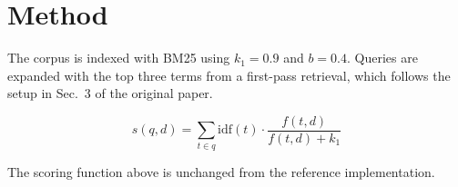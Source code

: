 \section{Method}

The corpus is indexed with BM25 using $k_1 = 0.9$ and $b = 0.4$. Queries are
expanded with the top three terms from a first-pass retrieval, which follows
the setup in Sec.~3 of the original paper.

\begin{equation}
  \label{eq:score}
  s(q, d) = \sum_{t \in q} \mathrm{idf}(t) \cdot \frac{f(t, d)}{f(t, d) + k_1}
\end{equation}

The scoring function above is unchanged from the reference implementation.
